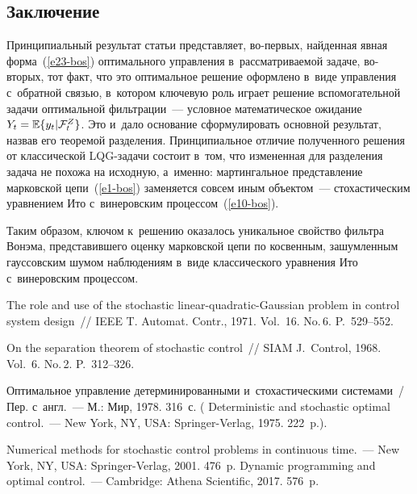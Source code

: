 \begin{multicols}{2}
\vspace*{-6pt}

\section{Заключение}

\vspace*{-2pt}
     
     Принципиальный результат статьи представляет, во-первых, найденная 
явная форма~(\ref{e23-bos}) оптимального управления в~рассматриваемой 
задаче, во-вторых, тот факт, что это оптимальное решение оформлено в~виде 
управления с~обратной связью, в~котором ключевую роль играет решение 
вспомогательной задачи оптимальной фильтрации~--- условное 
математическое ожидание $Y_t\hm= \mathbb{E}\{ y_t\vert \mathcal{F}_t^Z\}$. 
Это и~дало основание сформулировать основной\linebreak
 результат, назвав его 
теоремой разделения. Принципиальное отличие полученного решения от 
класси\-че\-ской LQG-за\-да\-чи состоит в~том, что измененная для разделения 
задача не похожа на исходную, а~именно: мартингальное представление 
марковской цепи~(\ref{e1-bos}) заменяется совсем иным объектом~--- 
стохастическим уравнением Ито с~винеровским процессом~(\ref{e10-bos}). 


Таким образом, ключом к~решению оказалось уникальное свойство фильтра 
Вонэма, представившего оценку марковской цепи по косвенным, 
зашумленным гауссовским шумом наблюдениям в~виде классического 
уравнения Ито с~винеровским процессом.
     
{\small\frenchspacing
{%
\begin{thebibliography}{99}
 The role and use of the stochastic linear-quadratic-Gaussian problem in control 
system design~// IEEE T. Automat. Contr., 1971. Vol.~16. No.\,6. P.~529--552.
{

}
 On the separation theorem of stochastic control~// SIAM J.~Control, 1968. 
Vol.~6. No.\,2. P.~312--326.

 Оптимальное управление детерминированными 
и~стохастическими системами~/ Пер. с~англ.~--- М.: Мир, 1978. 316~с. 
( Deterministic and stochastic optimal control.~--- New 
York, NY, USA: Springer-Verlag, 1975. 222~p.).

 Numerical methods for stochastic control problems in 
continuous time.~--- New York, NY, USA: Springer-Verlag, 2001. 476~p.
 Dynamic programming and optimal control.~--- Cambridge: Athena 
Scientific, 2017. 576~p.


\end{thebibliography}}}
\end{multicols}
